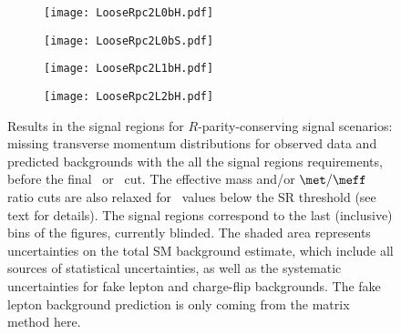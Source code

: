 \begin{figure}[p!]
\centering
 \begin{subfigure}{0.42\textwidth}
 \texttt{[image: LooseRpc2L0bH.pdf]}
 \end{subfigure}
 \begin{subfigure}{0.42\textwidth}
 \texttt{[image: LooseRpc2L0bS.pdf]}
 \end{subfigure}
  \begin{subfigure}{0.42\textwidth}
 \texttt{[image: LooseRpc2L1bH.pdf]}
 \end{subfigure}
  \begin{subfigure}{0.42\textwidth}
 \texttt{[image: LooseRpc2L2bH.pdf]}
 \end{subfigure}
   \caption{
Results in the signal regions for $R$-parity-conserving signal scenarios: 
missing transverse momentum distributions for observed data and predicted backgrounds 
with the all the signal regions requirements, before the final \met\ or \meff\ cut. 
The effective mass and/or $\met/\meff$ ratio cuts are also relaxed for \met\ values below the SR threshold (see text for details). 
The signal regions correspond to the last (inclusive) bins of the figures, currently blinded. 
The shaded area represents uncertainties on the total SM background estimate, 
which include all sources of statistical uncertainties, 
as well as the systematic uncertainties for fake lepton and charge-flip backgrounds. 
The fake lepton background prediction is only coming from the matrix method here. 
}
\label{fig:results_datamc_rpc}
\end{figure}


